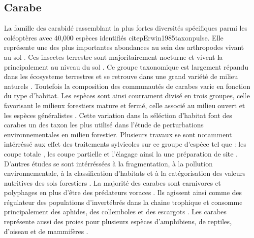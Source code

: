 \subsection*{Carabe}

La famille des carabidé rassemblant la plus fortes diversités spécifiques parmi les coléoptères avec 40,000 espèces identifiés citep{Erwin1985taxonpulse}.
Elle représente une des plus importantes abondances au sein des arthropodes vivant au sol \citep{loveiEcologyBehaviorGround1996,Rochefort2006GroundBeetle}.
Ces insectes terrestre sont majoritairement nocturne et vivent la principalement au niveau du sol \citep{loveiEcologyBehaviorGround1996,Rochefort2006GroundBeetle}.
Ce groupe taxonomique est largement répandu dans les écosysteme terrestres et se retrouve dans une grand variété de milieu naturels \citep{Larochelle2003naturalhistory}. 
Toutefois la composition des communautés de carabes varie en fonction du type d'habitat.
Les espèces sont ainsi courrament divisé en trois groupes, celle favorisant le milieux forestiers mature et fermé, celle associé au milieu ouvert et les espèces généralistes \citep{Niemela2007effectsforestry}.
Cette variation dans la séléction d'habitat font des carabes un des taxon les plus utilisé dans l'étude de perturbations environnementales en milieu forestier.
Plusieurs travaux se sont notamment intérréssé aux effet des traitements sylvicoles sur ce groupe d'espèce tel que : les coupe totale \citep{Heliola2001Distributioncarabid,koivulaBorealCarabidbeetleColeoptera2002a,Niemela1993Effectsclearcut}, 
les coupe partielle et l'élagage \citep{Lemieux2004Groundbeetle,Peck2004Longertermeffects,mooreEffectsTwoSilvicultural2004}
ainsi la une préparation de site \citep{Duchesne*1999EffectsClearCutting}.
D'autres études se sont intérréssées à la fragmentation, à la pollution environnementale, à la classification d'habitats et à la catégorisation des valeurs nutritives des sols forestiers \citep{bouchardBeetleCommunityResponse2016b,Halme1993Carabidbeetles,Luff1992Classificationprediction,Niemela2001Carabidbeetles,Rainio2003Groundbeetles,Work2008Evaluationcarabid}.
La majorité des carabes sont carnivores et polyphages en plus d’être des prédateurs voraces \citep{loveiEcologyBehaviorGround1996}. 
Ils agissent ainsi comme des régulateur des populations d’invertébrés dans la chaine trophique et consomme principalement des aphides, des collemboles et des escargots \citep{loveiEcologyBehaviorGround1996}. 
Les carabes représente aussi des proies pour plusieurs espèces d’amphibiens, de reptiles, d’oiseau et de mammifères \citep{loveiEcologyBehaviorGround1996}. 


